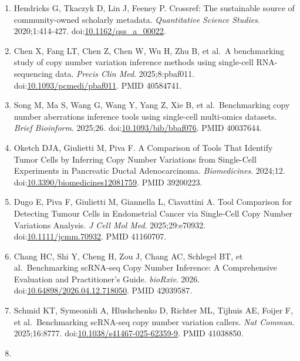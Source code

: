 \documentclass{article}
\begin{document}
\begin{enumerate}
  al.~CZ CELLxGENE Discover: a single-cell data platform for scalable
  exploration, analysis and modeling of aggregated data. \emph{Nucleic
  Acids Res}. 2025;53:D886-D900.
  doi:\href{https://doi.org/10.1093/nar/gkae1142}{10.1093/nar/gkae1142}.
  PMID 39607691.
\item
  Hendricks G, Tkaczyk D, Lin J, Feeney P. Crossref: The sustainable
  source of community-owned scholarly metadata. \emph{Quantitative
  Science Studies}. 2020;1:414-427.
  doi:\href{https://doi.org/10.1162/qss_a_00022}{10.1162/qss\_a\_00022}.
\item
  Chen X, Fang LT, Chen Z, Chen W, Wu H, Zhu B, et al.~A benchmarking
  study of copy number variation inference methods using single-cell
  RNA-sequencing data. \emph{Precis Clin Med}. 2025;8:pbaf011.
  doi:\href{https://doi.org/10.1093/pcmedi/pbaf011}{10.1093/pcmedi/pbaf011}.
  PMID 40584741.
\item
  Song M, Ma S, Wang G, Wang Y, Yang Z, Xie B, et al.~Benchmarking copy
  number aberrations inference tools using single-cell multi-omics
  datasets. \emph{Brief Bioinform}. 2025;26.
  doi:\href{https://doi.org/10.1093/bib/bbaf076}{10.1093/bib/bbaf076}.
  PMID 40037644.
\item
  Oketch DJA, Giulietti M, Piva F. A Comparison of Tools That Identify
  Tumor Cells by Inferring Copy Number Variations from Single-Cell
  Experiments in Pancreatic Ductal Adenocarcinoma. \emph{Biomedicines}.
  2024;12.
  doi:\href{https://doi.org/10.3390/biomedicines12081759}{10.3390/biomedicines12081759}.
  PMID 39200223.
\item
  Dugo E, Piva F, Giulietti M, Giannella L, Ciavattini A. Tool
  Comparison for Detecting Tumour Cells in Endometrial Cancer via
  Single-Cell Copy Number Variations Analysis. \emph{J Cell Mol Med}.
  2025;29:e70932.
  doi:\href{https://doi.org/10.1111/jcmm.70932}{10.1111/jcmm.70932}.
  PMID 41160707.
\item
  Chang HC, Shi Y, Cheng H, Zou J, Chang AC, Schlegel BT, et
  al.~Benchmarking scRNA-seq Copy Number Inference: A Comprehensive
  Evaluation and Practitioner's Guide. \emph{bioRxiv}. 2026.
  doi:\href{https://doi.org/10.64898/2026.04.12.718050}{10.64898/2026.04.12.718050}.
  PMID 42039587.
\item
  Schmid KT, Symeonidi A, Hlushchenko D, Richter ML, Tijhuis AE, Foijer
  F, et al.~Benchmarking scRNA-seq copy number variation callers.
  \emph{Nat Commun}. 2025;16:8777.
  doi:\href{https://doi.org/10.1038/s41467-025-62359-9}{10.1038/s41467-025-62359-9}.
  PMID 41038850.
\item

\end{enumerate}
\end{document}
